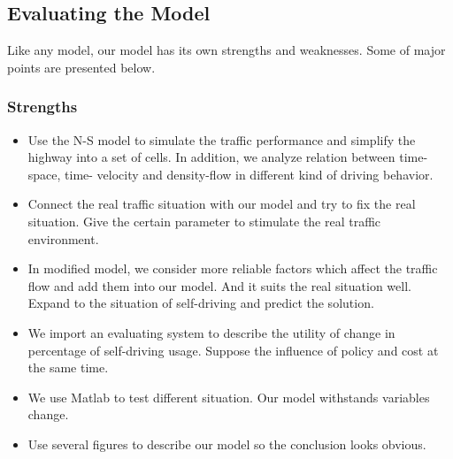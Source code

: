 \documentclass{mcmthesis}
\numberwithin{equation}{section}
\begin{document}
		\subsection{Evaluating the Model}
			Like any model, our model has its own strengths and weaknesses. Some of major points are presented below. 

			\subsubsection{Strengths}
				\begin{itemize}
					\item Use the N-S model to simulate the traffic performance and simplify the highway into a set of cells. In addition, we analyze relation between time-space, time- velocity and density-flow in different kind of driving behavior.
					\item Connect the real traffic situation with our model and try to fix the real situation. Give the certain parameter to stimulate the real traffic environment.
					\item In modified model, we consider more reliable factors which affect the traffic flow and add them into our model. And it suits the real situation well. Expand to the situation of self-driving and predict the solution.
					\item We import an evaluating system to describe the utility of change in percentage of self-driving usage. Suppose the influence of policy and cost at the same time.
					\item We use Matlab to test different situation. Our model withstands variables change.
					\item Use several figures to describe our model so the conclusion looks obvious.
				\end{itemize}
\end{document}
